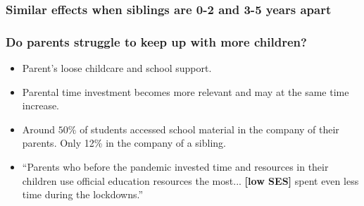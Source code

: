 \documentclass{beamer}
\begin{document}
\begin{frame}
    \label{frame:siblingdisruption}
    \frametitle{Similar effects when siblings are 0-2 and 3-5 years apart}
        {
    }

    \begin{flushleft}
        \hyperlink{frame:siblingdisruption_siblings}{}
    \end{flushleft}    

\end{frame}




\begin{frame}
    \label{frame:parentaldilution_intro}
    \frametitle{Do parents struggle to keep up with more children?}
       \begin{itemize}
           \item Parent's loose childcare and school support.
           \item Parental time investment becomes more relevant and may at the same time increase.
           \item Around $50\%$ of students accessed school material in the company of their parents. Only 12\% in the company of a sibling. %


           
           \item ``Parents who before the pandemic invested time and resources in their children use official education resources the most...  \textbf{[low SES]} spent  even less time during the lockdowns.'' {\tiny\cite{naslund-hadley_education_2021}}
       \end{itemize}
\end{frame}
\end{document}
